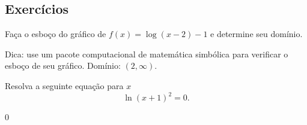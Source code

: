 \subsection*{Exercícios}

\begin{exer}
  Faça o esboço do gráfico de $f(x) = \log(x-2)-1$ e determine seu domínio.
\end{exer}
\begin{resp}
  Dica: use um pacote computacional de matemática simbólica para verificar o esboço de seu gráfico. Domínio: $(2, \infty)$.
\end{resp}

\begin{exer}
  Resolva a seguinte equação para $x$
  \begin{equation}
    \ln(x+1)^2=0.
  \end{equation}
\end{exer}
\begin{resp}
  $0$
\end{resp}
